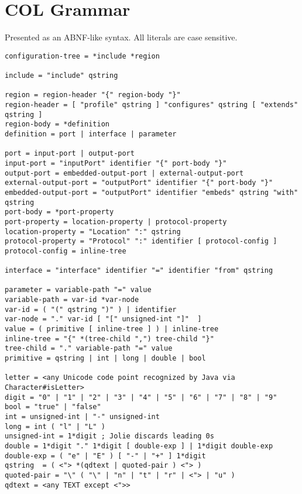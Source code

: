 \section{COL Grammar}\label{package-specification}

Presented as an ABNF-like syntax. All literals are case sensitive.

\begin{verbatim}
configuration-tree = *include *region

include = "include" qstring

region = region-header "{" region-body "}"
region-header = [ "profile" qstring ] "configures" qstring [ "extends" qstring ]
region-body = *definition
definition = port | interface | parameter

port = input-port | output-port
input-port = "inputPort" identifier "{" port-body "}"
output-port = embedded-output-port | external-output-port
external-output-port = "outputPort" identifier "{" port-body "}"
embedded-output-port = "outputPort" identifier "embeds" qstring "with" qstring
port-body = *port-property
port-property = location-property | protocol-property
location-property = "Location" ":" qstring
protocol-property = "Protocol" ":" identifier [ protocol-config ]
protocol-config = inline-tree

interface = "interface" identifier "=" identifier "from" qstring

parameter = variable-path "=" value
variable-path = var-id *var-node
var-id = ( "(" qstring ")" ) | identifier
var-node = "." var-id [ "[" unsigned-int "]"  ]
value = ( primitive [ inline-tree ] ) | inline-tree
inline-tree = "{" *(tree-child ",") tree-child "}"
tree-child = "." variable-path "=" value
primitive = qstring | int | long | double | bool

letter = <any Unicode code point recognized by Java via Character#isLetter>
digit = "0" | "1" | "2" | "3" | "4" | "5" | "6" | "7" | "8" | "9"
bool = "true" | "false"
int = unsigned-int | "-" unsigned-int
long = int ( "l" | "L" )
unsigned-int = 1*digit ; Jolie discards leading 0s
double = 1*digit "." 1*digit [ double-exp ] | 1*digit double-exp
double-exp = ( "e" | "E" ) [ "-" | "+" ] 1*digit
qstring  = ( <"> *(qdtext | quoted-pair ) <"> )
quoted-pair = "\" ( "\" | "n" | "t" | "r" | <"> | "u" )
qdtext = <any TEXT except <">>
\end{verbatim}
